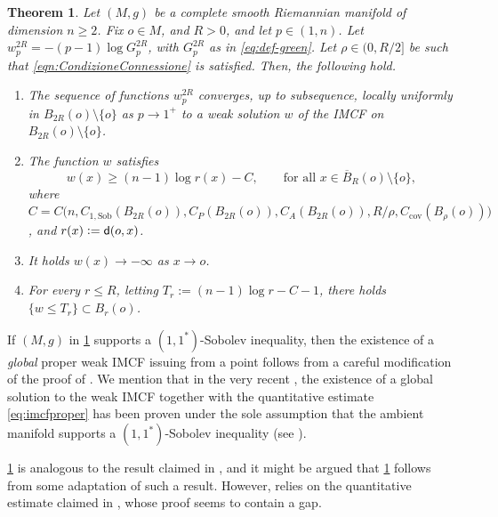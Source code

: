 \documentclass[a4paper,12pt,reqno]{amsart}
\numberwithin{equation}{section}
\theoremstyle{plain}
\newtheorem{theorem}{Theorem}[section]
\theoremstyle{definition}
\theoremstyle{remark}
\newcommand{\eqdef}{\ensuremath{\vcentcolon=}}
\newcommand{\dist}{\mathsf{d}}
\begin{document}
{\begin{theorem}
\label{thm:existenceimcfisoplocalized}
Let $(M,g)$ be a complete smooth Riemannian manifold of dimension $n\ge 2$. Fix $o\in M$, and $R>0$, and let $p\in (1,n)$. Let $w_p^{2R} = -(p-1) \log G_p^{2R}$, with $G_p^{2R}$ as in \eqref{eq:def-green}. Let $\rho \in (0,R/2]$ be such that \eqref{eqn:CondizioneConnessione} is satisfied. Then, the following hold.
\begin{enumerate}
\item The sequence of functions $w_p^{2R}$ converges, up to subsequence,
locally uniformly in $B_{2R}(o)\setminus\{o\}$ as $p \to 1^+$ to a weak solution $w$ of the IMCF on $B_{2R}(o) \setminus \{o\}$.
\item The function $w$ satisfies
\begin{equation}\label{eq:imcfproper}
        w(x) \geq (n-1) \log r(x) -  C, \qquad \text{for all $x\in \overline{B}_{R}(o)\setminus\{o\}$},
    \end{equation}
where $C=C\big(n, C_{1, \mathrm{Sob}}(B_{2R}(o)), C_P(B_{2R}(o)), C_A(B_{2R}(o)), R/\rho, C_{\mathrm{cov}}(B_\rho(o))\big)$, and $r(x)\eqdef \dist(o,x)$.
\item It holds $w(x)\to -\infty$ as $x\to o$.
\item For every $r\leq R$, letting $T_r:=(n-1)\log r-C-1$, there holds $\{w\leq T_r\}\subset B_r(o)$.
\end{enumerate}
\end{theorem}

\begin{remark}\label{rem:RisultatiKai}
    If $(M,g)$ in \cref{thm:existenceimcfisoplocalized} supports a $(1,1^*)$-Sobolev inequality, then the existence of a \emph{global} proper weak IMCF issuing from a point follows from a careful modification of the proof of \cite{KaiXu}. We mention that in the very recent \cite{XuPhDThesis}, the existence of a global solution to the weak IMCF together with the quantitative estimate \eqref{eq:imcfproper} has been proven under the sole assumption that the ambient manifold  supports a $(1,1^*)$-Sobolev inequality (see \cite[Theorem B]{XuPhDThesis}).
\end{remark}


\begin{remark}
\cref{thm:existenceimcfisoplocalized} is analogous to the result claimed in \cite[Theorem 1.7]{mari_flowlaplaceapproximationnew_2022}, and it might be argued that \cref{thm:existenceimcfisoplocalized} follows from some adaptation of such a result. However,\cite[Theorem 1.7]{mari_flowlaplaceapproximationnew_2022} relies on the quantitative estimate claimed in \cite[Theorem 3.6]{mari_flowlaplaceapproximationnew_2022}, whose proof seems to contain a gap.
\end{remark}


}
\end{document}
